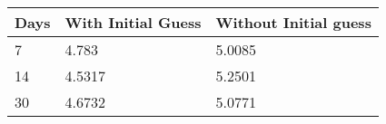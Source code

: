\begin{tabular}{lll}
Days & With Initial Guess & Without Initial guess \\ 
\hline 
7 & 4.783 & 5.0085 \\ 
14 & 4.5317 & 5.2501 \\ 
30 & 4.6732 & 5.0771 \\ 
\hline 
\end{tabular}